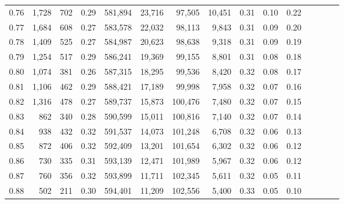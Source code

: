 \begin{tabular}{rrrcrrrrrrrrrrr}
0.76 &   1,728 &    702 &                                       0.29 &  581,894 &   23,716 &   97,505 &   10,451 &  0.31 &  0.10 &                         0.22 \\
0.77 &   1,684 &    608 &                                       0.27 &  583,578 &   22,032 &   98,113 &    9,843 &  0.31 &  0.09 &                         0.20 \\
0.78 &   1,409 &    525 &                                       0.27 &  584,987 &   20,623 &   98,638 &    9,318 &  0.31 &  0.09 &                         0.19 \\
0.79 &   1,254 &    517 &                                       0.29 &  586,241 &   19,369 &   99,155 &    8,801 &  0.31 &  0.08 &                         0.18 \\
0.80 &   1,074 &    381 &                                       0.26 &  587,315 &   18,295 &   99,536 &    8,420 &  0.32 &  0.08 &                         0.17 \\
0.81 &   1,106 &    462 &                                       0.29 &  588,421 &   17,189 &   99,998 &    7,958 &  0.32 &  0.07 &                         0.16 \\
0.82 &   1,316 &    478 &                                       0.27 &  589,737 &   15,873 &  100,476 &    7,480 &  0.32 &  0.07 &                         0.15 \\
0.83 &     862 &    340 &                                       0.28 &  590,599 &   15,011 &  100,816 &    7,140 &  0.32 &  0.07 &                         0.14 \\
0.84 &     938 &    432 &                                       0.32 &  591,537 &   14,073 &  101,248 &    6,708 &  0.32 &  0.06 &                         0.13 \\
0.85 &     872 &    406 &                                       0.32 &  592,409 &   13,201 &  101,654 &    6,302 &  0.32 &  0.06 &                         0.12 \\
0.86 &     730 &    335 &                                       0.31 &  593,139 &   12,471 &  101,989 &    5,967 &  0.32 &  0.06 &                         0.12 \\
0.87 &     760 &    356 &                                       0.32 &  593,899 &   11,711 &  102,345 &    5,611 &  0.32 &  0.05 &                         0.11 \\
0.88 &     502 &    211 &                                       0.30 &  594,401 &   11,209 &  102,556 &    5,400 &  0.33 &  0.05 &                         0.10 \\

\end{tabular}
